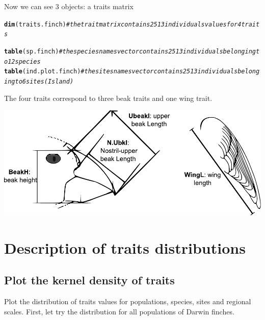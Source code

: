 \documentclass[12pt]{article}\usepackage[]{graphicx}\usepackage[]{color}
\makeatletter
\newcommand{\hlcom}[1]{\textcolor[rgb]{0.678,0.584,0.686}{\textit{#1}}}%
\newcommand{\hlstd}[1]{\textcolor[rgb]{0.345,0.345,0.345}{#1}}%
\newcommand{\hlkwd}[1]{\textcolor[rgb]{0.737,0.353,0.396}{\textbf{#1}}}%
\newenvironment{kframe}{%
 \def\at@end@of@kframe{}%
 \ifinner\ifhmode%
  \def\at@end@of@kframe{\end{minipage}}%
  \begin{minipage}{\columnwidth}%
 \fi\fi%
 \def\FrameCommand##1{\hskip\@totalleftmargin \hskip-\fboxsep
 \colorbox{shadecolor}{##1}\hskip-\fboxsep
     \hskip-\linewidth \hskip-\@totalleftmargin \hskip\columnwidth}%
 \MakeFramed {\advance\hsize-\width
   \@totalleftmargin\z@ \linewidth\hsize
   \@setminipage}}%
 {\par\unskip\endMakeFramed%
 \at@end@of@kframe}
\newenvironment{knitrout}{}{} %
\makeatother
\begin{document}
Now we can see 3 objects: a traits matrix 
\begin{knitrout}
\color{fgcolor}\begin{kframe}
\begin{alltt}
\hlkwd{dim}\hlstd{(traits.finch)} \hlcom{#the trait matrix contains 2513 individuals values for 4 traits}

\hlkwd{table}\hlstd{(sp.finch)} \hlcom{#the species names vector contains 2513 individuals belonging to 12 species}
\hlkwd{table}\hlstd{(ind.plot.finch)} \hlcom{#the sites names vector contains 2513 individuals belonging to 6 sites (Island)}
\end{alltt}
\end{kframe}
\end{knitrout}

The four traits correspond to three beak traits and one wing trait.

\begin{center}
\includegraphics[width=\textwidth]{figs/darwinfinch.pdf}
\end{center}

\newpage


\section{Description of traits distributions}

\subsection{Plot the kernel density of traits}

Plot the distribution of traits values for populations, species, sites and regional scales. First, let try the distribution for all populations of Darwin finches.
\end{document}
